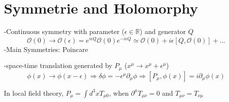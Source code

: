 \documentclass[type = bachelor]{fduthesis-en}
\begin{document}
\section{Symmetrie and Holomorphy}
-Continuous symmetry with parameter ($\epsilon \in \mathbb{R}$) and generator $Q$
\begin{equation}
\mathcal{O}(0)\rightarrow\mathcal{O}(\epsilon)=e^{i\epsilon Q}\mathcal{O}(0)e^{-i\epsilon Q}\simeq \mathcal{O}(0)+i\epsilon[Q,\mathcal{O}(0)]+...
\end{equation}
-Main Symmetries: Poincare

-space-time translation generated by $P_{\mu}$ ($x^\mu\rightarrow x^\mu+\epsilon^\mu$)
\begin{equation}
\phi(x)\rightarrow\phi(x-\epsilon)\Rightarrow \delta\phi=-\epsilon^\mu\partial_\mu\phi\Rightarrow[P_\mu,\phi(x)]=i\partial_\mu\phi(x)
\end{equation}

In local field theory, $P_\mu=\int d^3x T_{\mu0}$, when $\partial^\mu T_{\mu\nu}=0$ and $T_{\mu\nu}=T_{\nu\mu}$

    
\printbibliography
\end{document}
